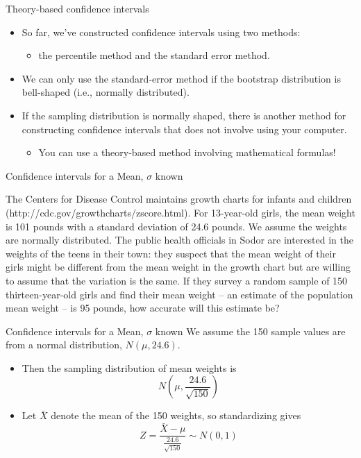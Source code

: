\documentclass[
  ignorenonframetext,
]{beamer}
\providecommand{\tightlist}{%
  \setlength{\itemsep}{0pt}\setlength{\parskip}{0pt}}
\begin{document}
\begin{frame}{Theory-based confidence intervals}
\protect\hypertarget{theory-based-confidence-intervals-1}{}
\begin{itemize}
\item
  So far, we've constructed confidence intervals using two methods:

  \begin{itemize}
  \tightlist
  \item
    the percentile method and the standard error method.
  \end{itemize}
\item
  We can only use the standard-error method if the bootstrap
  distribution is bell-shaped (i.e., normally distributed).
\item
  If the sampling distribution is normally shaped, there is another
  method for constructing confidence intervals that does not involve
  using your computer.

  \begin{itemize}
  \tightlist
  \item
    You can use a theory-based method involving mathematical formulas!
  \end{itemize}
\end{itemize}
\end{frame}

\begin{frame}{Confidence intervals for a Mean, \(\sigma\) known}
\protect\hypertarget{confidence-intervals-for-a-mean-sigma-known}{}
\begin{tcolorbox}
The Centers for Disease Control maintains growth charts for infants and children (http://cdc.gov/growthcharts/zscore.html). For 13-year-old girls, the mean weight is 101 pounds with a standard deviation of 24.6 pounds. We assume the weights are normally distributed. The public health officials in Sodor are interested in the weights of the teens in their town: they suspect that the mean weight of their girls might be different from the mean weight in the growth chart but are willing to assume that the variation is the same. If they survey a random sample of 150 thirteen-year-old girls and find their mean weight – an estimate of the population mean weight – is 95 pounds, how accurate will this estimate be?
\end{tcolorbox}
\end{frame}

\begin{frame}{Confidence intervals for a Mean, \(\sigma\) known}
\protect\hypertarget{confidence-intervals-for-a-mean-sigma-known-1}{}
We assume the 150 sample values are from a normal distribution,
\(N(\mu, 24.6)\).

\begin{itemize}
\item
  Then the sampling distribution of mean weights is
  \[N\left(\mu,\frac{24.6}{\sqrt{150}}\right)\]
\item
  Let \(\bar{X}\) denote the mean of the 150 weights, so standardizing
  gives \[Z=\frac{\bar{X}-\mu}{\frac{24.6}{\sqrt{150}}}\sim N(0,1)\]
\end{itemize}
\end{frame}
\end{document}
